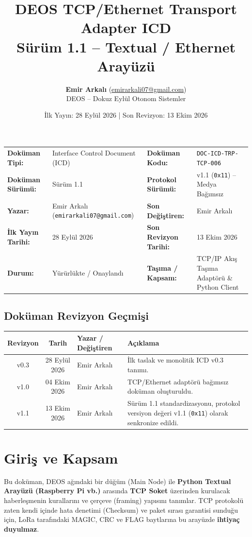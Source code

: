 \documentclass[a4paper,10pt]{article}
\title{\textbf{DEOS TCP/Ethernet Transport Adapter ICD}\\
\large Sürüm 1.1 -- Textual / Ethernet Arayüzü}
\author{\textbf{Emir Arkalı} (\href{mailto:emirarkali07@gmail.com}{emirarkali07@gmail.com})\\DEOS -- Dokuz Eylül Otonom Sistemler}
\date{İlk Yayın: 28 Eylül 2026 \quad | \quad Son Revizyon: 13 Ekim 2026}
\newcommand{\hex}[1]{\texttt{0x#1}}
\newcommand{\code}[1]{\texttt{#1}}
\begin{document}
\maketitle

\begin{center}
\small
\begin{tabularx}{\textwidth}{ll lX}
\toprule
\textbf{Doküman Tipi:} & Interface Control Document (ICD) & \textbf{Doküman Kodu:} & \code{DOC-ICD-TRP-TCP-006} \\
\textbf{Doküman Sürümü:} & Sürüm 1.1 & \textbf{Protokol Sürümü:} & v1.1 (\hex{11}) -- Medya Bağımsız \\
\textbf{Yazar:} & Emir Arkalı (\texttt{emirarkali07@gmail.com}) & \textbf{Son Değiştiren:} & Emir Arkalı \\
\textbf{İlk Yayın Tarihi:} & 28 Eylül 2026 & \textbf{Son Revizyon Tarihi:} & 13 Ekim 2026 \\
\textbf{Durum:} & Yürürlükte / Onaylandı & \textbf{Taşıma / Kapsam:} & TCP/IP Akış Taşıma Adaptörü \& Python Client \\
\bottomrule
\end{tabularx}
\end{center}

\subsection*{Doküman Revizyon Geçmişi}
\begin{center}
\small
\begin{tabularx}{\textwidth}{c c l X}
\toprule
\textbf{Revizyon} & \textbf{Tarih} & \textbf{Yazar / Değiştiren} & \textbf{Açıklama} \\
\midrule
v0.3 & 28 Eylül 2026 & Emir Arkalı & İlk taslak ve monolitik ICD v0.3 tanımı. \\
v1.0 & 04 Ekim 2026 & Emir Arkalı & TCP/Ethernet adaptörü bağımsız doküman oluşturuldu. \\
v1.1 & 13 Ekim 2026 & Emir Arkalı & Sürüm 1.1 standardizasyonu, protokol versiyon değeri v1.1 (\hex{11}) olarak senkronize edildi. \\
\bottomrule
\end{tabularx}
\end{center}
\vspace{0.8em}

\section{Giriş ve Kapsam}
Bu doküman, DEOS ağındaki bir düğüm (Main Node) ile \textbf{Python Textual Arayüzü (Raspberry Pi vb.)} arasında \textbf{TCP Soket} üzerinden kurulacak haberleşmenin kurallarını ve çerçeve (framing) yapısını tanımlar. TCP protokolü zaten kendi içinde hata denetimi (Checksum) ve paket sırası garantisi sunduğu için, LoRa tarafındaki MAGIC, CRC ve FLAG baytlarına bu arayüzde \textbf{ihtiyaç duyulmaz}.
\end{document}
